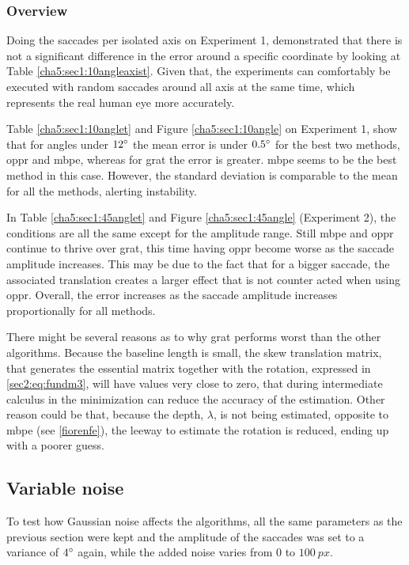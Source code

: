 \subsubsection{Overview}

Doing the saccades per isolated axis on Experiment 1, demonstrated that there is not a significant difference in the error around a specific coordinate by looking at Table \ref{cha5:sec1:10angleaxist}. Given that, the experiments can comfortably be executed with random saccades around all axis at the same time, which represents the real human eye more accurately.

Table \ref{cha5:sec1:10anglet} and Figure \ref{cha5:sec1:10angle} on Experiment 1, show that for angles under $ 12 \degree $ the mean error is under $0.5 \degree$ for the best two methods, \acrshort{oppr} and \acrshort{mbpe}, whereas for \acrshort{grat} the error is greater. \acrshort{mbpe} seems to be the best method in this case. However, the standard deviation is comparable to the mean for all the methods, alerting instability.

In Table \ref{cha5:sec1:45anglet} and Figure \ref{cha5:sec1:45angle} (Experiment 2), the conditions are all the same except for the amplitude range. Still \acrshort{mbpe} and \acrshort{oppr} continue to thrive over \acrshort{grat}, this time having \acrshort{oppr} become worse as the saccade amplitude increases. This may be due to the fact that for a bigger saccade, the associated translation creates a larger effect that is not counter acted when using \acrshort{oppr}. Overall, the error increases as the saccade amplitude increases proportionally for all methods.

There might be several reasons as to why \acrshort{grat} performs worst than the other algorithms. Because the baseline length is small, the skew translation matrix, that generates the essential matrix together with the rotation, expressed in \ref{sec2:eq:fundm3}, will have values very close to zero, that during intermediate calculus in the minimization can reduce the accuracy of the estimation. Other reason could be that, because the depth, $\lambda$, is not being estimated, opposite to \acrshort{mbpe} (see \ref{fiorenfe}), the leeway to estimate the rotation is reduced, ending up with a poorer guess.
 

\subsection{Variable noise}
To test how Gaussian noise affects the algorithms, all the same parameters as the previous section were kept and the amplitude of the saccades was set to a variance of $4 \degree$ again, while the added noise varies from $0$ to $100 \ px$. 
